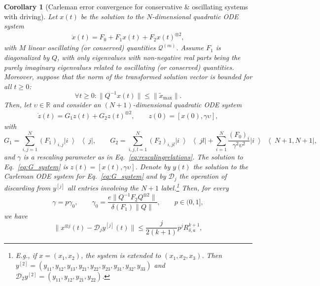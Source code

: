 \documentclass[superscriptaddress,onecolumn,nofootinbib,longbibliography,a4paper,accepted=2026-09-29]{quantumarticle}
\theoremstyle{plain}
\newtheorem{cor}[thm]{Corollary}
\theoremstyle{definition}
\numberwithin{thm}{section}
\numberwithin{assumption}{section}
\numberwithin{lemma}{section}
\numberwithin{prop}{section}
\numberwithin{cor}{section}
\numberwithin{definition}{section}
\numberwithin{rmk}{section}
\numberwithin{equation}{section}
\newcommand{\ketbra}[2]   {\left|#1\middle\rangle\!\middle\langle#2\right|}
\newcommand{\ot}{\otimes}
\newcommand\D{ {\mathcal D} }
\newcommand\Q{ {\mathcal Q} }
\begin{document}
\begin{cor}[Carleman error convergence for conservative \& oscillating systems with driving]
\label{cor:Carleman_cons_extension}
    Let $x(t)$ be the solution to the $N$-dimensional quadratic ODE system
    \begin{align}
    \dot{x}(t) = F_0 + F_1 x(t)+ F_2x(t)^{\otimes 2},
    \end{align}
    with $M$ linear oscillating (or conserved) quantities $\Q^{(m)}$. Assume $F_1$ is diagonalized by $Q$, with only eigenvalues with non-negative real parts being the purely imaginary eigenvalues related to oscillating (or conserved) quantities. Moreover, suppose that the norm of the transformed solution vector is bounded for all $t \ge 0$:
    \begin{equation}
        \forall t \ge 0: \|Q^{-1} x(t)\| \leq \|\tilde{x}_{\mathrm{max}}\|.
    \end{equation}
    Then, let $\upsilon \in \mathbb{R}$ and consider an $(N+1)$-dimensional quadratic ODE system
    \begin{align}
    \label{eq:G_system}
    \dot{z}(t) = G_1 z(t)+ G_2 z(t)^{\otimes 2}, \quad \quad
            z(0) = [x(0),\gamma \upsilon],
    \end{align}
    with 
    \begin{equation}
        G_1 = \sum_{i,j=1}^N (F_1)_{i,j} \ketbra{i}{j},\qquad
        G_2 = \sum_{i,j,l=1}^N (F_2)_{i,jl} \ketbra{i}{jl} + \sum_{i=1}^N \frac{(F_0)_i}{\gamma^2 \upsilon^2} \ketbra{i}{N+1,N+1},
    \end{equation}
    and $\gamma$ is a rescaling parameter as in Eq.~\eqref{eq:rescalingrelations}.
    The solution to Eq.~\eqref{eq:G_system} is $z(t)=[x(t),\gamma \upsilon]$. Denote by $y(t)$ the solution to the Carleman ODE system for Eq.~\eqref{eq:G_system} and by $\D_j$ the operation of discarding from $y^{[j]}$ all entries involving the $N+1$ label.\footnote{E.g., if $x=(x_1,x_2)$, the system is extended to $(x_1,x_2,x_3)$. Then $y^{[2]} = (y_{11}, y_{12}, y_{13}, y_{21}, y_{22}, y_{23}, y_{31}, y_{32}, y_{33})$ and $\mathcal{D}_2 y^{[2]} = (y_{11}, y_{12}, y_{21}, y_{22})$.} 
    Then, for every \begin{equation}
        \gamma = p \gamma_0,\qquad \gamma_0=\frac{e\|Q^{-1}F_2Q^{\otimes 2}\|}{\delta(F_1)\|Q\|},\qquad p\in(0,1],
    \end{equation}
    we have
    \begin{equation}
        \|x^{\ot j}(t) -\D_j y^{[j]}(t)\| \leq  \frac{j}{2(k+1)} p^j R_{\delta,a}^{k+1},

\end{equation}
\end{cor}
\end{document}
